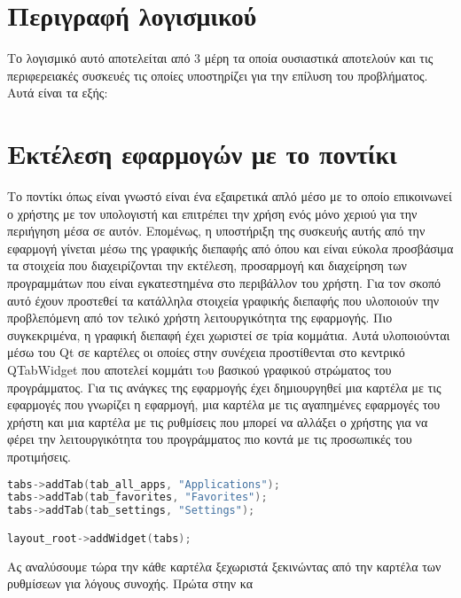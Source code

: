 





\section{Περιγραφή λογισμικού}


Το λογισμικό αυτό αποτελείται από 3 μέρη τα οποία ουσιαστικά αποτελούν και
τις περιφερειακές συσκευές τις οποίες υποστηρίζει για την επίλυση του προβλήματος.
Αυτά είναι τα εξής:

\section{Εκτέλεση εφαρμογών με το ποντίκι}


Το ποντίκι όπως είναι γνωστό είναι ένα εξαιρετικά απλό μέσο με το οποίο επικοινωνεί
ο χρήστης με τον υπολογιστή και επιτρέπει την χρήση ενός μόνο χεριού για την περιήγηση
μέσα σε αυτόν. Επομένως, η υποστήριξη της συσκευής αυτής από την εφαρμογή γίνεται
μέσω της γραφικής διεπαφής από όπου και είναι εύκολα προσβάσιμα τα στοιχεία που
διαχειρίζονται την εκτέλεση, προσαρμογή και διαχείρηση των προγραμμάτων που είναι
εγκατεστημένα στο περιβάλλον του χρήστη. Για τον σκοπό αυτό έχουν προστεθεί τα κατάλληλα
στοιχεία γραφικής διεπαφής που υλοποιούν την προβλεπόμενη από τον τελικό χρήστη 
λειτουργικότητα της εφαρμογής. Πιο συγκεκριμένα, η γραφική διεπαφή έχει χωριστεί σε τρία κομμάτια.
Αυτά υλοποιούνται μέσω του Qt σε καρτέλες οι οποίες στην συνέχεια προστίθενται στο
κεντρικό QTabWidget που αποτελεί κομμάτι τoυ βασικού γραφικού στρώματος του προγράμματος.
Για τις ανάγκες της εφαρμογής έχει δημιουργηθεί μια καρτέλα με τις εφαρμογές που γνωρίζει
η εφαρμογή, μια καρτέλα με τις αγαπημένες εφαρμογές του χρήστη και μια καρτέλα με τις
ρυθμίσεις που μπορεί να αλλάξει ο χρήστης για να φέρει την λειτουργικότητα του προγράμματος
πιο κοντά με τις προσωπικές του προτιμήσεις.

\begin{lstlisting}[language=C++, style=cppstyle]
tabs->addTab(tab_all_apps, "Applications");
tabs->addTab(tab_favorites, "Favorites");
tabs->addTab(tab_settings, "Settings");

layout_root->addWidget(tabs);
\end{lstlisting}

Ας αναλύσουμε τώρα την κάθε καρτέλα ξεχωριστά ξεκινώντας από την καρτέλα των ρυθμίσεων για
λόγους συνοχής. Πρώτα στην κα







\begin{lstlisting}[language=C++, style=cppstyle]
\end{lstlisting}